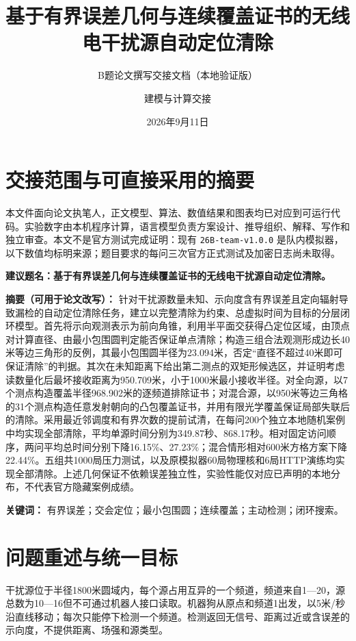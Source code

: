 \documentclass[
  chinese,
  UTF8,
  a4paper,
  zihao=-4]{ctexart}
\title{基于有界误差几何与连续覆盖证书的无线电干扰源自动定位清除}
\subtitle{B题论文撰写交接文档（本地验证版）}
\author{建模与计算交接}
\date{2026年9月11日}
\begin{document}
\maketitle

{
\setcounter{tocdepth}{2}
\tableofcontents
}
\section{交接范围与可直接采用的摘要}\label{ux4ea4ux63a5ux8303ux56f4ux4e0eux53efux76f4ux63a5ux91c7ux7528ux7684ux6458ux8981}

本文件面向论文执笔人，正文模型、算法、数值结果和图表均已对应到可运行代码。实验数字由本机程序计算，语言模型负责方案设计、推导组织、解释、写作和独立审查。本文不是官方测试完成证明：现有
\texttt{26B-team-v1.0.0}
是队内模拟器，以下数值均标明来源；题目要求的每问三次官方正式测试及加密日志尚未取得。

\textbf{建议题名：基于有界误差几何与连续覆盖证书的无线电干扰源自动定位清除。}

\textbf{摘要（可用于论文改写）：}
针对干扰源数量未知、示向度含有界误差且定向辐射导致漏检的自动定位清除任务，建立以完整清除为约束、总虚拟时间为目标的分层闭环模型。首先将示向观测表示为前向角锥，利用半平面交获得凸定位区域，由顶点对计算直径、由最小包围圆判定能否保证单点清除；构造三组合法观测形成边长40米等边三角形的反例，其最小包围圆半径为23.094米，否定``直径不超过40米即可保证清除''的判据。其次在未知距离下给出第二测点的双矩形候选区，并证明考虑读数量化后最坏接收距离为950.709米，小于1000米最小接收半径。对全向源，以7个测点构造覆盖半径968.902米的逐频道排除证书；对混合源，以950米等边三角格的31个测点构造任意发射朝向的凸包覆盖证书，并用有限光学覆盖保证局部失联后的清除。采用最近邻调度和有界次数的提前试清，在每问200个独立本地随机案例中均实现全部清除，平均单源时间分别为349.87秒、868.17秒。相对固定访问顺序，两问平均总时间分别下降16.15\%、27.23\%；混合情形相对600米方格方案下降22.44\%。五组共1000局压力测试，以及原模拟器60局物理核和6局HTTP演练均实现全部清除。上述几何保证不依赖误差独立性，实验性能仅对应已声明的本地分布，不代表官方隐藏案例成绩。

\textbf{关键词：}
有界误差；交会定位；最小包围圆；连续覆盖；主动检测；闭环搜索。

\section{问题重述与统一目标}\label{ux95eeux9898ux91cdux8ff0ux4e0eux7edfux4e00ux76eeux6807}

干扰源位于半径1800米圆域内，每个源占用互异的一个频道，频道来自1---20，源总数为10---16但不可通过机器人接口读取。机器狗从原点和频道1出发，以5米/秒沿直线移动；每次只能停下检测一个频道。检测返回无信号、距离过近或含误差的示向度，不提供距离、场强和源类型。
\end{document}
